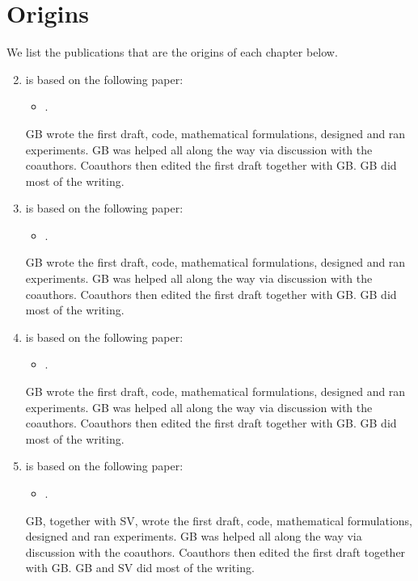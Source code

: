 
\section{Origins}
\label{section:introduction:origins}

We list the publications that are the origins of each chapter below.

\begin{enumerate}[label=\textbf{Chapter~\arabic*},align=left]
\setcounter{enumi}{1}

\item is based on the following paper:
\begin{itemize}
\item {}.
\end{itemize}
GB wrote the first draft, code, mathematical formulations, designed and ran experiments. GB was helped all along the way via discussion with the coauthors. Coauthors then edited the first draft together with GB. GB did most of the writing.


\item is based on the following paper:
\begin{itemize}
\item {}.
\end{itemize}
GB wrote the first draft, code, mathematical formulations, designed and ran experiments. GB was helped all along the way via discussion with the coauthors. Coauthors then edited the first draft together with GB. GB did most of the writing.


\item is based on the following paper:
\begin{itemize}
\item {}.
\end{itemize}
GB wrote the first draft, code, mathematical formulations, designed and ran experiments. GB was helped all along the way via discussion with the coauthors. Coauthors then edited the first draft together with GB. GB did most of the writing.


\item is based on the following paper:
\begin{itemize}
\item {}.
\end{itemize}
GB, together with SV, wrote the first draft, code, mathematical formulations, designed and ran experiments. GB was helped all along the way via discussion with the coauthors. Coauthors then edited the first draft together with GB. GB and SV did most of the writing.


\end{enumerate}

